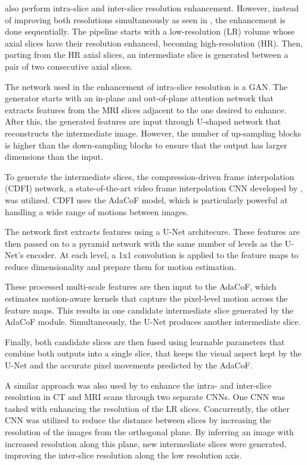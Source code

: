 \textcite{Nimitha2024} also perform intra-slice and inter-slice resolution enhancement. However, instead of improving both resolutions simultaneously as seen in \textcite{Zhang2024, Fang2022}, the enhancement is done sequentially. The pipeline starts with a low-resolution (LR) volume whose axial slices have their resolution enhanced, becoming high-resolution (HR). Then, parting from the HR axial slices, an intermediate slice is generated between a pair of two consecutive axial slices.
\par
The network used in the enhancement of intra-slice resolution is a GAN. The generator starts with an in-plane and out-of-plane attention network that extracts features from the MRI slices adjacent to the one desired to enhance. After this, the generated features are input through U-shaped network that reconstructs the intermediate image. However, the number of up-sampling blocks is higher than the down-sampling blocks to ensure that the output has larger dimensions than the input.
\par
To generate the intermediate slices, the compression-driven frame interpolation (CDFI) network, a state-of-the-art video frame interpolation CNN developed by \textcite{Ding2021}, was utilized. CDFI uses the AdaCoF model, which is particularly powerful at handling a wide range of motions between images.
\par 
The network first extracts features using a U-Net architecure. These features are then passed on to a pyramid network with the same number of levels as the U-Net's encoder. At each level, a 1x1 convolution is applied to the feature maps to reduce dimensionality and prepare them for motion estimation.
\par
These processed multi-scale features are then input to the AdaCoF, which estimates motion-aware kernels that capture the pixel-level motion across the feature maps. This results in one candidate intermediate slice generated by the AdaCoF module. Simultaneously, the U-Net produces another intermediate slice.
\par 
Finally, both candidate slices are then fused using learnable parameters that combine both outputs into a single slice, that keeps the visual aspect kept by the U-Net and the accurate pixel movements predicted by the AdaCoF.
\par
A similar approach was also used by \textcite{Georgescu2020} to enhance the intra- and inter-slice resolution in CT and MRI scans through two separate CNNs. One CNN was tasked with enhancing the resolution of the LR slices. Concurrently, the other CNN was utilized to reduce the distance between slices by increasing the resolution of the images from the orthogonal plane. By inferring an image with increased resolution along this plane, new intermediate slices were generated, improving the inter-slice resolution along the low resolution axis.
